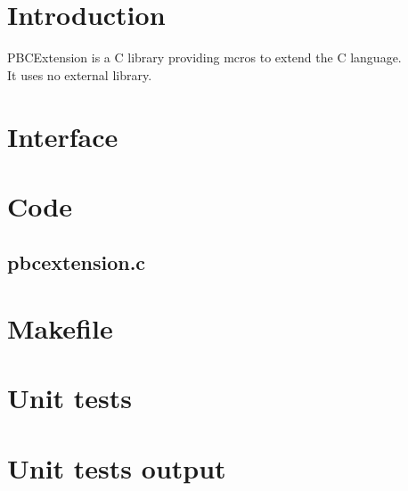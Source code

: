 \section*{Introduction}

PBCExtension is a C library providing mcros to extend the C language.\\ 

It uses no external library.\\

\section{Interface}

\begin{scriptsize}
\begin{ttfamily}

\end{ttfamily}
\end{scriptsize}

\section{Code}

\subsection{pbcextension.c}

\begin{scriptsize}
\begin{ttfamily}

\end{ttfamily}
\end{scriptsize}

\section{Makefile}

\begin{scriptsize}
\begin{ttfamily}

\end{ttfamily}
\end{scriptsize}

\section{Unit tests}

\begin{scriptsize}
\begin{ttfamily}

\end{ttfamily}
\end{scriptsize}

\section{Unit tests output}

\begin{scriptsize}
\begin{ttfamily}

\end{ttfamily}
\end{scriptsize}


